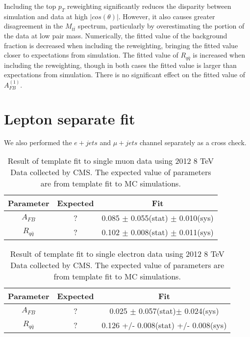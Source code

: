 \documentclass{cmspaperpdf}
\begin{document}
Including the top $p_{T}$ reweighting significantly reduces the disparity between simulation and data at high $|cos(\theta)|$. However, it also causes greater disagreement in the $M_{t\bar{t}}$ spectrum, particularly by overestimating the portion of the data at low pair mass. Numerically, the fitted value of the background fraction is decreased when including the reweighting, bringing the fitted value closer to expectations from simulation. The fitted value of $R_{q\bar q}$ is increased when including the reweighting, though in both cases the fitted value is larger than expectations from simulation. There is no significant effect on the fitted value of $A^{(1)}_{FB}$.

\clearpage
\section{Lepton separate fit}

We also performed the $e+jets$ and $\mu+jets$ channel separately as a cross check. 

\begin{table}[hbt]
\begin{center}
\begin{tabular}{c|cc}\hline
Parameter                 & Expected  & Fit   \\
\hline
$A_{FB}$					  & ?  &  0.085 $\pm$ 0.055(stat) $\pm$ 0.010(sys) \\
$R_{q\bar{q}}$			  & ? &  0.102 $\pm$ 0.008(stat) $\pm$ 0.011(sys) \\
\end{tabular}
\end{center}
\label{tab:result_mu}
\caption{Result of template fit to single muon data using 2012 8 TeV Data collected by CMS.  The expected value of parameters are from template fit to MC simulations. }
\end{table}

\begin{table}[hbt]
\begin{center}
\begin{tabular}{c|cc}\hline
Parameter                  & Expected  & Fit   \\
\hline
$A_{FB}$					 &	?	& 0.025 $\pm$ 0.057(stat)$\pm$ 0.024(sys) \\
$R_{q\bar{q}}$	& ? &  0.126 +/- 0.008(stat) +/- 0.008(sys)   \\
\end{tabular}
\end{center}
\label{tab:result_el}
\caption{Result of template fit to single electron data using 2012 8 TeV Data collected by CMS. The expected value of parameters are from template fit to MC simulations. }
\end{table}
\end{document}
